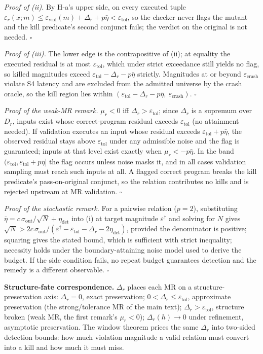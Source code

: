 \documentclass[review,12pt,authoryear]{elsarticle}
\begin{document}
\emph{Proof of (ii).} By H-a's upper side, on every executed tuple
$\varepsilon_r(x; m) \leq \varepsilon_{\mathrm{viol}}(m) + \Delta_r + p\bar\eta < \varepsilon_{\mathrm{tol}}$,
so the checker never flags the mutant and the kill predicate's second
conjunct fails; the verdict on the original is not needed. $\square$

\emph{Proof of (iii).} The lower edge is the contrapositive of (ii); at
equality the executed residual is at most $\varepsilon_{\mathrm{tol}}$,
which under strict exceedance still yields no flag, so killed magnitudes
exceed
$\varepsilon_{\mathrm{tol}} - \Delta_r - p\bar\eta$
strictly. Magnitudes at or beyond $\varepsilon_{\mathrm{crash}}$ violate
S4 latency and are excluded from the admitted universe by the crash
oracle, so the kill region lies within
$(\varepsilon_{\mathrm{tol}} - \Delta_r - p\bar\eta,\ \varepsilon_{\mathrm{crash}})$.
$\square$

\emph{Proof of the weak-MR remark.} $\mu_r < 0$ iff
$\Delta_r > \varepsilon_{\mathrm{tol}}$; since $\Delta_r$ is a supremum
over $D_r$, inputs exist whose correct-program residual exceeds
$\varepsilon_{\mathrm{tol}}$ (no attainment needed). If validation
executes an input whose residual exceeds
$\varepsilon_{\mathrm{tol}} + p\bar\eta$, the observed residual stays
above $\varepsilon_{\mathrm{tol}}$ under any admissible noise and the
flag is guaranteed; inputs at that level exist exactly when
$\mu_r < -p\bar\eta$. In the band
$(\varepsilon_{\mathrm{tol}}, \varepsilon_{\mathrm{tol}} + p\bar\eta]$
the flag occurs unless noise masks it, and in all cases validation
sampling must reach such inputs at all. A flagged correct program
breaks the kill predicate's pass-on-original conjunct, so the relation
contributes no kills and is rejected upstream at MR validation.
$\square$

\emph{Proof of the stochastic remark.} For a pairwise relation
($p = 2$), substituting
$\bar\eta = c\,\sigma_{\mathrm{out}}/\sqrt{N} + \eta_{\mathrm{det}}$
into (i) at target magnitude $\varepsilon^\dagger$ and solving for $N$
gives
$\sqrt{N} > 2c\,\sigma_{\mathrm{out}}/(\varepsilon^\dagger - \varepsilon_{\mathrm{tol}} - \Delta_r - 2\eta_{\mathrm{det}})$,
provided the denominator is positive; squaring gives the stated bound,
which is sufficient with strict inequality; necessity holds under the
boundary-attaining noise model used to derive the budget. If the side
condition fails, no repeat budget guarantees detection and the remedy
is a different observable. $\square$

\textbf{Structure-fate correspondence.} $\Delta_r$ places each MR on a
structure-preservation axis: $\Delta_r = 0$, exact preservation;
$0 < \Delta_r \leq \varepsilon_{\mathrm{tol}}$, approximate
preservation (the strong/tolerance MR of the main text);
$\Delta_r > \varepsilon_{\mathrm{tol}}$, structure broken (weak MR, the
first remark's $\mu_r < 0$); $\Delta_r(h) \to 0$ under refinement,
asymptotic preservation. The window theorem prices the same $\Delta_r$
into two-sided detection bounds: how much violation magnitude a valid
relation must convert into a kill and how much it must miss.
\end{document}
